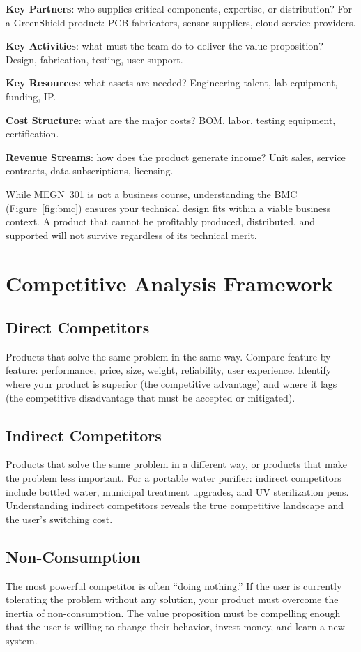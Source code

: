 \documentclass[11pt,letterpaper,twoside,openany]{book}
\begin{document}
\textbf{Key Partners}: who supplies critical components, expertise, or distribution? For a GreenShield product: PCB fabricators, sensor suppliers, cloud service providers.

\textbf{Key Activities}: what must the team do to deliver the value proposition? Design, fabrication, testing, user support.

\textbf{Key Resources}: what assets are needed? Engineering talent, lab equipment, funding, IP.

\textbf{Cost Structure}: what are the major costs? BOM, labor, testing equipment, certification.

\textbf{Revenue Streams}: how does the product generate income? Unit sales, service contracts, data subscriptions, licensing.

While MEGN~301 is not a business course, understanding the BMC (Figure~\ref{fig:bmc}) ensures your technical design fits within a viable business context. A product that cannot be profitably produced, distributed, and supported will not survive regardless of its technical merit.

\section{Competitive Analysis Framework}
\subsection{Direct Competitors}
Products that solve the same problem in the same way. Compare feature-by-feature: performance, price, size, weight, reliability, user experience. Identify where your product is superior (the competitive advantage) and where it lags (the competitive disadvantage that must be accepted or mitigated).

\subsection{Indirect Competitors}
Products that solve the same problem in a different way, or products that make the problem less important. For a portable water purifier: indirect competitors include bottled water, municipal treatment upgrades, and UV sterilization pens. Understanding indirect competitors reveals the true competitive landscape and the user's switching cost.

\subsection{Non-Consumption}
The most powerful competitor is often ``doing nothing.'' If the user is currently tolerating the problem without any solution, your product must overcome the inertia of non-consumption. The value proposition must be compelling enough that the user is willing to change their behavior, invest money, and learn a new system.
\end{document}
